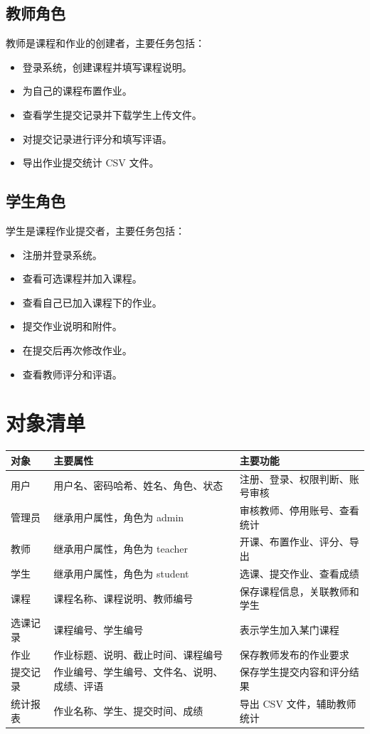 \documentclass[UTF8,12pt]{ctexart}
\begin{document}
\subsection{教师角色}

教师是课程和作业的创建者，主要任务包括：

\begin{itemize}
  \item 登录系统，创建课程并填写课程说明。
  \item 为自己的课程布置作业。
  \item 查看学生提交记录并下载学生上传文件。
  \item 对提交记录进行评分和填写评语。
  \item 导出作业提交统计 CSV 文件。
\end{itemize}

\subsection{学生角色}

学生是课程作业提交者，主要任务包括：

\begin{itemize}
  \item 注册并登录系统。
  \item 查看可选课程并加入课程。
  \item 查看自己已加入课程下的作业。
  \item 提交作业说明和附件。
  \item 在提交后再次修改作业。
  \item 查看教师评分和评语。
\end{itemize}

\newpage

\section{对象清单}

\begin{longtable}{>{\raggedright\arraybackslash}p{2.5cm}p{5.2cm}p{6cm}}
\toprule
对象 & 主要属性 & 主要功能 \\
\midrule
用户 & 用户名、密码哈希、姓名、角色、状态 & 注册、登录、权限判断、账号审核 \\
管理员 & 继承用户属性，角色为 admin & 审核教师、停用账号、查看统计 \\
教师 & 继承用户属性，角色为 teacher & 开课、布置作业、评分、导出 \\
学生 & 继承用户属性，角色为 student & 选课、提交作业、查看成绩 \\
课程 & 课程名称、课程说明、教师编号 & 保存课程信息，关联教师和学生 \\
选课记录 & 课程编号、学生编号 & 表示学生加入某门课程 \\
作业 & 作业标题、说明、截止时间、课程编号 & 保存教师发布的作业要求 \\
提交记录 & 作业编号、学生编号、文件名、说明、成绩、评语 & 保存学生提交内容和评分结果 \\
统计报表 & 作业名称、学生、提交时间、成绩 & 导出 CSV 文件，辅助教师统计 \\
\bottomrule
\end{longtable}
\end{document}
